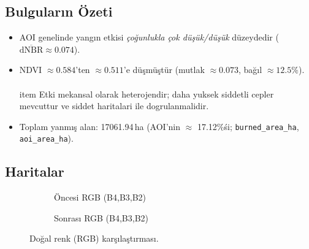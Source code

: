 \documentclass[11pt,a4paper]{article}
\begin{document}
\subsection{Bulguların Özeti}
\begin{itemize}
  \item AOI genelinde yangın etkisi \emph{çoğunlukla çok düşük/düşük} düzeydedir (\(\overline{\mathrm{dNBR}} \approx 0.074\)).
  \item NDVI \(\approx0.584\)'ten \(\approx0.511\)'e düşmüştür (mutlak \(\approx0.073\), bağıl \(\approx12.5\%\)).
  \\\\item Etki mekansal olarak heterojendir; daha yuksek siddetli cepler mevcuttur ve siddet haritalari ile dogrulanmalidir.
  \item Toplam yanmış alan: \num{17061.94}\,ha (AOI'nin \(\approx\) \num{17.12}\%\'si; \texttt{burned\_area\_ha}, \texttt{aoi\_area\_ha}).
\end{itemize}
\subsection{Haritalar}
\begin{figure}[H]
  \centering
  \begin{subfigure}[b]{0.48\textwidth}
    \centering
    \caption{Öncesi RGB (B4,B3,B2)}
  \end{subfigure}\hfill
  \begin{subfigure}[b]{0.48\textwidth}
    \centering
    \caption{Sonrası RGB (B4,B3,B2)}
  \end{subfigure}
  \caption{Doğal renk (RGB) karşılaştırması.}
  \label{fig:rgb}
\end{figure}
\FloatBarrier
\end{document}

